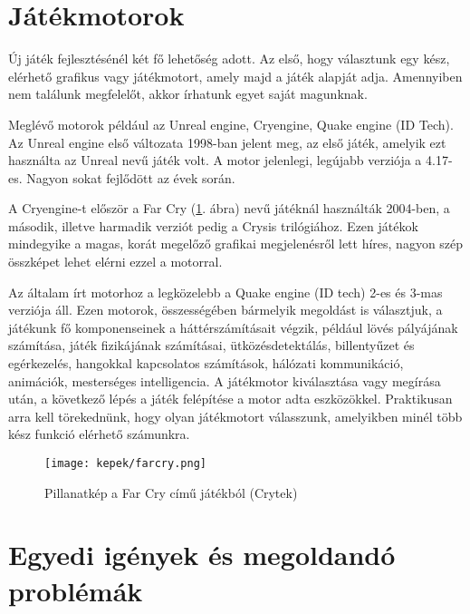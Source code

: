 \label{Chap:problemakor}

\section{Játékmotorok}

Új játék fejlesztésénél két fő lehetőség adott. Az első, hogy választunk egy kész, elérhető grafikus vagy játékmotort, amely majd a játék alapját adja. Amennyiben nem találunk megfelelőt, akkor írhatunk egyet saját magunknak.


Meglévő motorok például az Unreal engine, Cryengine, Quake engine (ID Tech). Az Unreal engine első változata 1998-ban jelent meg, az első játék, amelyik ezt használta az Unreal nevű játék volt. A motor jelenlegi, legújabb verziója a 4.17-es. Nagyon sokat fejlődött az évek során.


A Cryengine-t először a Far Cry (\ref{fig:farcry}. ábra) nevű játéknál használták 2004-ben, a második, illetve harmadik verziót pedig a Crysis trilógiához. Ezen játékok mindegyike a magas, korát megelőző grafikai megjelenésről lett híres, nagyon szép összképet lehet elérni ezzel a motorral.


Az általam írt motorhoz a legközelebb a Quake engine (ID tech) 2-es és 3-mas verziója áll. Ezen motorok, összességében bármelyik megoldást is választjuk, a játékunk fő komponenseinek a háttérszámításait végzik, például lövés pályájának számítása, játék fizikájának számításai, ütközésdetektálás, billentyűzet és egérkezelés, hangokkal kapcsolatos számítások, hálózati kommunikáció, animációk, mesterséges intelligencia. A játékmotor kiválasztása vagy megírása után, a következő lépés a játék felépítése a motor adta eszközökkel. Praktikusan arra kell törekednünk, hogy olyan játékmotort válasszunk, amelyikben minél több kész funkció elérhető számunkra.

\begin{figure}[h]
\centering
\texttt{[image: kepek/farcry.png]}
\caption{Pillanatkép a Far Cry című játékból (Crytek)}
\label{fig:farcry}
\end{figure}

\section{Egyedi igények és megoldandó problémák}

